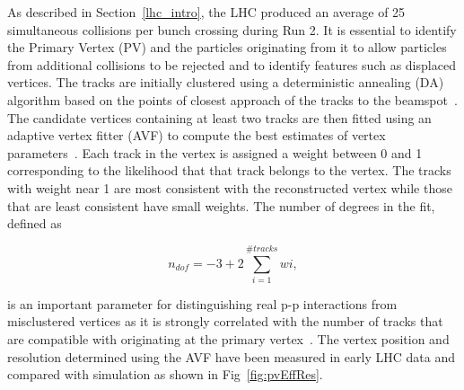 As described in Section~\ref{lhc_intro}, the LHC produced an average of 25 simultaneous collisions per bunch crossing
during Run 2. It is essential to identify the Primary Vertex (PV) and the particles originating from it to allow 
particles from additional collisions to be rejected and to identify features such as displaced vertices. The tracks
are initially clustered using a deterministic annealing (DA) algorithm based on the points of closest approach of the 
tracks to the beamspot~\cite{tracker_vertex}. The candidate vertices containing at least two tracks are then
fitted using an adaptive vertex fitter (AVF) to compute the best estimates of vertex parameters~\cite{tracker_avf}. 
Each track in the vertex is assigned a weight between 0 and 1 corresponding to the likelihood that that track
belongs to the vertex. The tracks with weight near 1 are most consistent with the reconstructed vertex while
those that are least consistent have small weights. The number of degrees in the fit, defined as 

\begin{equation}
n_{dof} = -3 + 2 \sum_{i=1}^{\#tracks} wi,
\end{equation}

is an important parameter for distinguishing real p-p interactions from misclustered vertices 
as it is strongly correlated with the number of tracks that are compatible 
with originating at the primary vertex~\cite{tracker_vertex}. The vertex
position and resolution determined using the AVF have been 
measured in early LHC data and compared with simulation as shown in Fig~\ref{fig:pvEffRes}.

